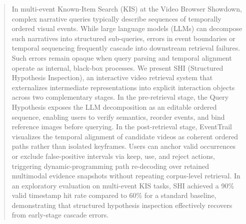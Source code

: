 \begin{abstract}
In multi-event Known-Item Search (KIS) at the Video Browser Showdown,
complex narrative queries typically describe sequences of temporally ordered
visual events. While large language models (LLMs) can decompose such narratives
into structured sub-queries, errors in event boundaries or temporal sequencing
frequently cascade into downstream retrieval failures. Such errors remain
opaque when query parsing and temporal alignment operate as internal,
black-box processes. We present SHI (Structured Hypothesis Inspection), an
interactive video retrieval system that externalizes intermediate
representations into explicit interaction objects across two complementary
stages. In the pre-retrieval stage, the Query Hypothesis exposes the
LLM decomposition as an editable ordered sequence, enabling users to verify
semantics, reorder events, and bind reference images before querying. In the
post-retrieval stage, EventTrail visualizes the temporal alignment of candidate
videos as coherent ordered paths rather than isolated keyframes. Users can
anchor valid occurrences or exclude false-positive intervals via keep, use,
and reject actions, triggering dynamic-programming path re-decoding over
retained multimodal evidence snapshots without repeating corpus-level
retrieval. In an exploratory evaluation on multi-event KIS tasks, SHI achieved
a 90\% valid timestamp hit rate compared to 60\% for a standard baseline,
demonstrating that structured hypothesis inspection effectively recovers from
early-stage cascade errors.

\end{abstract}